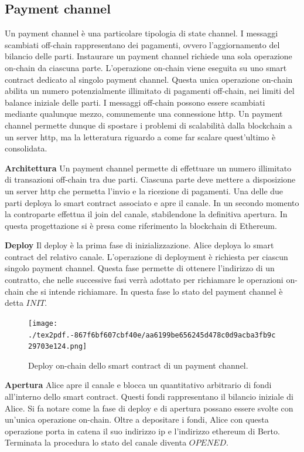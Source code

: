 \documentclass[12pt,italian,]{book}
\begin{document}
\hypertarget{payment-channel}{%
\subsection{Payment channel}\label{payment-channel}}

Un payment channel è una particolare tipologia di state channel. I messaggi scambiati off-chain rappresentano dei pagamenti, ovvero l'aggiornamento del bilancio delle parti. Instaurare un payment channel richiede una sola operazione on-chain da ciascuna parte. L'operazione on-chain viene eseguita su uno smart contract dedicato al singolo payment channel. Questa unica operazione on-chain abilita un numero potenzialmente illimitato di pagamenti off-chain, nei limiti del balance iniziale delle parti. I messaggi off-chain possono essere scambiati mediante qualunque mezzo, comunemente una connessione http. Un payment channel permette dunque di spostare i problemi di scalabilità dalla blockchain a un server http, ma la letteratura riguardo a come far scalare quest'ultimo è consolidata.

\textbf{\textbf{Architettura}} Un payment channel permette di effettuare un numero illimitato di transazioni off-chain tra due parti. Ciascuna parte deve mettere a disposizione un server http che permetta l'invio e la ricezione di pagamenti. Una delle due parti deploya lo smart contract associato e apre il canale. In un secondo momento la controparte effettua il join del canale, stabilendone la definitiva apertura. In questa progettazione si è presa come riferimento la blockchain di Ethereum.

\textbf{\textbf{Deploy}} Il deploy è la prima fase di inizializzazione. Alice deploya lo smart contract del relativo canale. L'operazione di deployment è richiesta per ciascun singolo payment channel. Questa fase permette di ottenere l'indirizzo di un contratto, che nelle successive fasi verrà adottato per richiamare le operazioni on-chain che si intende richiamare. In questa fase lo stato del payment channel è detta \(INIT\).

\begin{figure}
\centering
\texttt{[image: ./tex2pdf.-867f6bf607cbf40e/aa6199be656245d478c0d9acba3fb9c29703e124.png]}
\caption{Deploy on-chain dello smart contract di un payment channel.}
\end{figure}

\textbf{\textbf{Apertura}} Alice apre il canale e blocca un quantitativo arbitrario di fondi all'interno dello smart contract. Questi fondi rappresentano il bilancio iniziale di Alice. Si fa notare come la fase di deploy e di apertura possano essere svolte con un'unica operazione on-chain. Oltre a depositare i fondi, Alice con questa operazione porta in catena il suo indirizzo ip e l'indirizzo ethereum di Berto. Terminata la procedura lo stato del canale diventa \(OPENED\).
\end{document}
